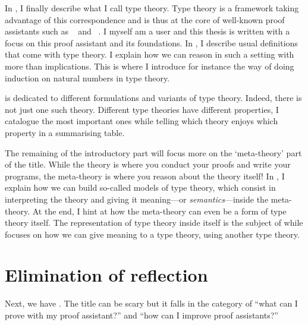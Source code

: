 In , I finally describe what I call type theory.
Type theory is a framework taking advantage of this correspondence and is thus
at the core of well-known proof assistants such as \Coq~
and \Agda~. I myself am a \Coq user and this
thesis is written with a focus on this proof assistant and its foundations.
In , I describe usual definitions that come with type theory.
I explain how we can reason in such a setting with more than implications.
%
This is where I introduce for instance the way of doing induction on natural
numbers in type theory.

 is dedicated to different formulations and variants of type
theory. Indeed, there is not just one such theory. Different type theories have
different properties, I catalogue the most important ones while telling which
theory enjoys which property in a summarising table.

The remaining of the introductory part will focus more on the `meta-theory'
part of the title. While the theory is where you conduct your proofs and write
your programs, the meta-theory is where you reason about the theory itself!
In , I explain how we can build so-called models of type theory,
which consist in interpreting the theory and giving it meaning---or
\emph{semantics}---inside the meta-theory. At the end, I hint at how the
meta-theory can even be a form of type theory itself. The representation of
type theory inside itself is the subject of  while
 focuses on how we can give meaning to a type theory, using
another type theory.

\section{Elimination of reflection}

Next, we have . The title can be scary but it falls in
the category of ``what can I prove with my proof assistant?'' and
``how can I improve proof assistants?''

